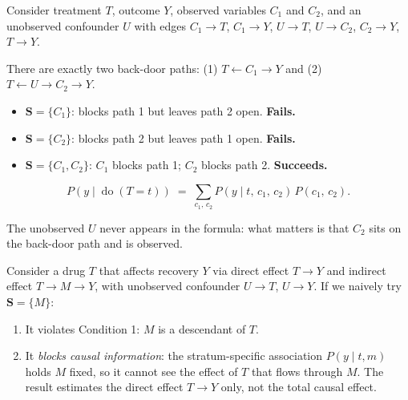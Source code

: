\documentclass[
  a4paper,
]{book}
\providecommand{\tightlist}{%
  \setlength{\itemsep}{0pt}\setlength{\parskip}{0pt}}
\newcommand{\doop}{\operatorname{do}}
\begin{document}
\begin{tcolorbox}[enhanced jigsaw, arc=.35mm, bottomrule=.15mm, bottomtitle=1mm, breakable, colback=white, colbacktitle=quarto-callout-note-color!10!white, colframe=quarto-callout-note-color-frame, coltitle=black, left=2mm, leftrule=.75mm, opacityback=0, opacitybacktitle=0.6, rightrule=.15mm, title={Example: Two Back-Door Paths --- Both Must Be Blocked}, titlerule=0mm, toprule=.15mm, toptitle=1mm]

Consider treatment \(T\), outcome \(Y\), observed variables \(C_1\) and
\(C_2\), and an unobserved confounder \(U\) with edges \(C_1 \to T\),
\(C_1 \to Y\), \(U \to T\), \(U \to C_2\), \(C_2 \to Y\), \(T \to Y\).

There are exactly two back-door paths: (1) \(T \leftarrow C_1 \to Y\)
and (2) \(T \leftarrow U \to C_2 \to Y\).

\begin{itemize}
\tightlist
\item
  \(\mathbf{S} = \{C_1\}\): blocks path 1 but leaves path 2 open.
  \textbf{Fails.}
\item
  \(\mathbf{S} = \{C_2\}\): blocks path 2 but leaves path 1 open.
  \textbf{Fails.}
\item
  \(\mathbf{S} = \{C_1, C_2\}\): \(C_1\) blocks path 1; \(C_2\) blocks
  path 2. \textbf{Succeeds.}
\end{itemize}

\[P(y \mid \doop(T{=}t)) \;=\; \sum_{c_1,\,c_2} P(y \mid t,\,c_1,\,c_2)\,P(c_1,\,c_2).\]

The unobserved \(U\) never appears in the formula: what matters is that
\(C_2\) sits on the back-door path and is observed.

\end{tcolorbox}

\begin{tcolorbox}[enhanced jigsaw, arc=.35mm, bottomrule=.15mm, bottomtitle=1mm, breakable, colback=white, colbacktitle=quarto-callout-warning-color!10!white, colframe=quarto-callout-warning-color-frame, coltitle=black, left=2mm, leftrule=.75mm, opacityback=0, opacitybacktitle=0.6, rightrule=.15mm, title={Why Condition 1 Is Essential: A Worked Counterexample}, titlerule=0mm, toprule=.15mm, toptitle=1mm]

Consider a drug \(T\) that affects recovery \(Y\) via direct effect
\(T \to Y\) and indirect effect \(T \to M \to Y\), with unobserved
confounder \(U \to T\), \(U \to Y\). If we naively try
\(\mathbf{S} = \{M\}\):

\begin{enumerate}
\def\labelenumi{\arabic{enumi}.}
\tightlist
\item
  It violates Condition 1: \(M\) is a descendant of \(T\).
\item
  It \emph{blocks causal information}: the stratum-specific association
  \(P(y \mid t, m)\) holds \(M\) fixed, so it cannot see the effect of
  \(T\) that flows through \(M\). The result estimates the direct effect
  \(T \to Y\) only, not the total causal effect.
\end{enumerate}

\end{tcolorbox}
\end{document}
